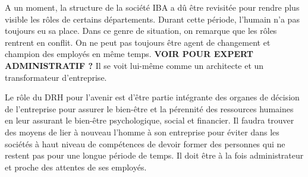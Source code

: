 \documentclass[12pt]{article}
\begin{document}
A un moment, la structure de la société IBA a dû être revisitée pour rendre plus visible les rôles de certains départements. Durant cette période, l'humain n'a pas toujours eu sa place. Dans ce genre de situation, on remarque que les rôles rentrent en conflit. On ne peut pas toujours être agent de changement et champion des employés en même temps. \textbf{VOIR POUR EXPERT ADMINISTRATIF ?} Il se voit lui-même comme un architecte et un transformateur d'entreprise.

Le rôle du DRH pour l'avenir est d'être partie intégrante des organes de décision de l'entreprise pour assurer le bien-être et la pérennité des ressources humaines en leur assurant le bien-être psychologique, social et financier. Il faudra trouver des moyens de lier à nouveau l'homme à son entreprise pour éviter dans les sociétés à haut niveau de compétences de devoir former des personnes qui ne restent pas pour une longue période de temps. Il doit être à la fois administrateur et proche des attentes de ses employés.
\end{document}
